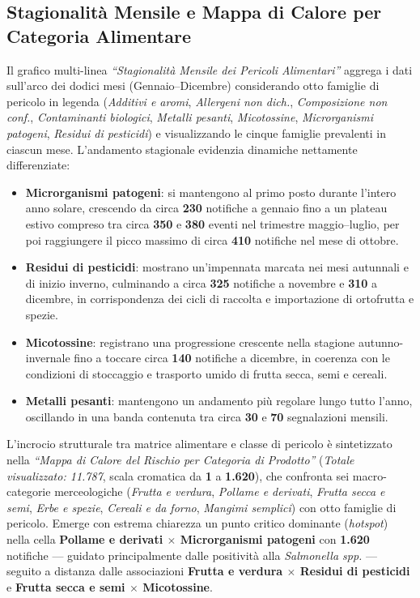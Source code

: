 \subsection{Stagionalità Mensile e Mappa di Calore per Categoria Alimentare}
Il grafico multi-linea \textit{``Stagionalità Mensile dei Pericoli Alimentari''} aggrega i dati sull'arco dei dodici mesi (Gennaio--Dicembre) considerando otto famiglie di pericolo in legenda (\textit{Additivi e aromi}, \textit{Allergeni non dich.}, \textit{Composizione non conf.}, \textit{Contaminanti biologici}, \textit{Metalli pesanti}, \textit{Micotossine}, \textit{Microrganismi patogeni}, \textit{Residui di pesticidi}) e visualizzando le cinque famiglie prevalenti in ciascun mese. L'andamento stagionale evidenzia dinamiche nettamente differenziate:
\begin{itemize}
    \item \textbf{Microrganismi patogeni}: si mantengono al primo posto durante l'intero anno solare, crescendo da circa \textbf{230} notifiche a gennaio fino a un plateau estivo compreso tra circa \textbf{350} e \textbf{380} eventi nel trimestre maggio--luglio, per poi raggiungere il picco massimo di circa \textbf{410} notifiche nel mese di ottobre.
    \item \textbf{Residui di pesticidi}: mostrano un'impennata marcata nei mesi autunnali e di inizio inverno, culminando a circa \textbf{325} notifiche a novembre e \textbf{310} a dicembre, in corrispondenza dei cicli di raccolta e importazione di ortofrutta e spezie.
    \item \textbf{Micotossine}: registrano una progressione crescente nella stagione autunno-invernale fino a toccare circa \textbf{140} notifiche a dicembre, in coerenza con le condizioni di stoccaggio e trasporto umido di frutta secca, semi e cereali.
    \item \textbf{Metalli pesanti}: mantengono un andamento più regolare lungo tutto l'anno, oscillando in una banda contenuta tra circa \textbf{30} e \textbf{70} segnalazioni mensili.
\end{itemize}

L'incrocio strutturale tra matrice alimentare e classe di pericolo è sintetizzato nella \textit{``Mappa di Calore del Rischio per Categoria di Prodotto''} (\textit{Totale visualizzato: 11.787}, scala cromatica da \textbf{1} a \textbf{1.620}), che confronta sei macro-categorie merceologiche (\textit{Frutta e verdura}, \textit{Pollame e derivati}, \textit{Frutta secca e semi}, \textit{Erbe e spezie}, \textit{Cereali e da forno}, \textit{Mangimi semplici}) con otto famiglie di pericolo. Emerge con estrema chiarezza un punto critico dominante (\textit{hotspot}) nella cella \textbf{Pollame e derivati $\times$ Microrganismi patogeni} con \textbf{1.620} notifiche --- guidato principalmente dalle positività alla \textit{Salmonella spp.} --- seguito a distanza dalle associazioni \textbf{Frutta e verdura $\times$ Residui di pesticidi} e \textbf{Frutta secca e semi $\times$ Micotossine}.

